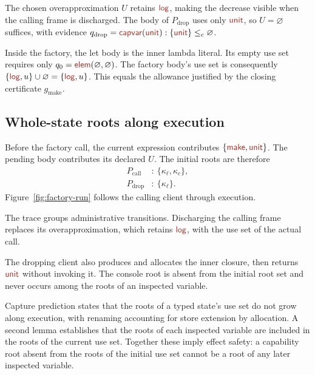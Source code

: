 The chosen overapproximation $U$ retains $\ev{log}$, making the decrease
visible when the calling frame is discharged. The body of
$P_{\mathrm{drop}}$ uses only $\ev{unit}$, so
$U=\varnothing$ suffices, with evidence
$q_{\mathrm{drop}}=\ev{capvar}(\ev{unit}):
\{\ev{unit}\}\le_c\varnothing$.

Inside the factory, the let body is the inner lambda literal. Its empty
use set requires only
$q_0=\ev{elem}(\varnothing,\varnothing)$.
The factory body's use set is consequently
$\{\ev{log},u\}\cup\varnothing=\{\ev{log},u\}$.
This equals the allowance justified by the closing certificate
$g_{\mathrm{make}}$.

\subsection*{Whole-state roots along execution}
Before the factory call, the current expression contributes
$\{\ev{make},\ev{unit}\}$. The pending body contributes its declared $U$.
The initial roots are therefore
\[
 \begin{aligned}
 P_{\mathrm{call}}&:\ \{\kappa_{\ell},\kappa_c\},\\
 P_{\mathrm{drop}}&:\ \{\kappa_{\ell}\}.
 \end{aligned}
\]
Figure~\ref{fig:factory-run} follows the calling client through execution.





The trace groups administrative transitions. Discharging the calling
frame replaces its overapproximation, which retains $\ev{log}$, with
the use set of the actual call.

The dropping client also produces and allocates the inner closure, then
returns $\ev{unit}$ without invoking it. The console root is absent from
the initial root set and never occurs among the roots of an inspected
variable.


\label{sec:capture-scope}

Capture prediction states that the roots of a typed state's use set do
not grow along execution, with renaming accounting for store extension
by allocation.
A second lemma establishes that the roots of each inspected variable
are included in the roots of the current use set. Together these imply
effect safety: a capability root absent from the roots of the initial
use set cannot be a root of any later inspected variable.

